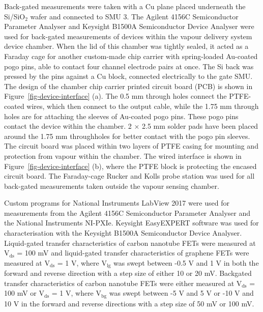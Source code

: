 \documentclass[
  a4paper,
]{scrbook}
\begin{document}
Back-gated measurements were taken with a Cu plane placed underneath the
Si/SiO\(_2\) wafer and connected to SMU 3. The Agilent 4156C
Semiconductor Parameter Analyser and Keysight B1500A Semiconductor
Device Analyser were used for back-gated measurements of devices within
the vapour delivery system device chamber. When the lid of this chamber
was tightly sealed, it acted as a Faraday cage for another custom-made
chip carrier with spring-loaded Au-coated pogo pins, able to contact
four channel electrode pairs at once. The Si back was pressed by the
pins against a Cu block, connected electrically to the gate SMU. The
design of the chamber chip carrier printed circuit board (PCB) is shown
in Figure~\ref{fig-device-interface} (a). The 0.5 mm through holes
connect the PTFE-coated wires, which then connect to the output cable,
while the 1.75 mm through holes are for attaching the sleeves of
Au-coated pogo pins. These pogo pins contact the device within the
chamber. 2 × 2.5 mm solder pads have been placed around the 1.75 mm
throughholes for better contact with the pogo pin sleeves. The circuit
board was placed within two layers of PTFE casing for mounting and
protection from vapour within the chamber. The wired interface is shown
in Figure~\ref{fig-device-interface} (b), where the PTFE block is
protecting the encased circuit board. The Faraday-cage Rucker and Kolls
probe station was used for all back-gated measurements taken outside the
vapour sensing chamber.

Custom programs for National Instruments LabView 2017 were used for
measurements from the Agilent 4156C Semiconductor Parameter Analyser and
the National Instruments NI-PXIe. Keysight EasyEXPERT software was used
for characterisation with the Keysight B1500A Semiconductor Device
Analyser. Liquid-gated transfer characteristics of carbon nanotube FETs
were measured at V\(_{\mathrm{ds}}\) = 100 mV and liquid-gated transfer
characteristics of graphene FETs were measured at V\(_{\mathrm{ds}}\) =
1 V, where V\(_{\mathrm{lg}}\) was swept between -0.5 V and 1 V in both
the forward and reverse direction with a step size of either 10 or 20
mV. Backgated transfer characteristics of carbon nanotube FETs were
either measured at V\(_{\mathrm{ds}}\) = 100 mV or V\(_{\mathrm{ds}}\) =
1 V, where V\(_{\mathrm{bg}}\) was swept between -5 V and 5 V or -10 V
and 10 V in the forward and reverse directions with a step size of 50 mV
or 100 mV.
\end{document}
